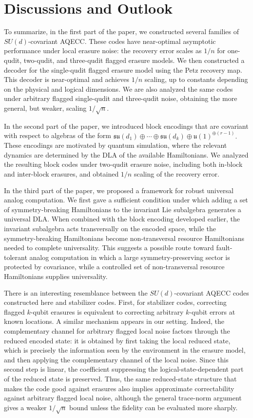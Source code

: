 \documentclass[10pt,twocolumn,superscriptaddress,aps,amsmath,amssymb,citeautoscript,floatfix,prx,longbibliography]{revtex4-2}
\newcounter{alg}
\theoremstyle{plain}
\theoremstyle{plain}
\theoremstyle{plain}
\theoremstyle{plain}
\theoremstyle{plain}
\theoremstyle{plain}
\begin{document}
\section{Discussions and Outlook}\label{sec:main_disc}

To summarize, in the first part of the paper, we constructed several families of \(SU(d)\)-covariant AQECC. These codes have near-optimal asymptotic performance under local erasure noise: the recovery error scales
as \(1/n\) for one-qudit, two-qudit, and three-qudit flagged erasure models. We then constructed a decoder for the single-qudit flagged erasure model using the Petz recovery map. This decoder is near-optimal and achieves \(1/n\) scaling, up to constants depending on the physical and logical dimensions. We are also analyzed the same codes
under arbitrary flagged single-qudit and three-qudit noise, obtaining the more general, but weaker, scaling \(1/\sqrt n\).

In the second part of the paper, we introduced block encodings that are covariant with respect to algebras of the form
$
    \mathfrak{su}(d_1)\oplus\cdots\oplus\mathfrak{su}(d_k)
    \oplus
    \mathfrak{u}(1)^{\oplus(r-1)}.
$
These encodings are motivated by quantum simulation, where the relevant dynamics are determined by the DLA of the available
Hamiltonians. We analyzed the resulting block codes under two-qudit erasure noise, including both in-block and inter-block erasures, and obtained \(1/n\) scaling of the recovery error.

In the third part of the paper, we proposed a framework for robust universal analog computation. We first gave a sufficient condition under which adding a set of symmetry-breaking Hamiltonians to the invariant Lie subalgebra generates a universal DLA. When combined with the block encoding developed
earlier, the invariant subalgebra acts transversally on the encoded space, while the symmetry-breaking Hamiltonians become non-transversal resource Hamiltonians needed to complete universality. This suggests a possible route toward fault-tolerant analog computation in which a large symmetry-preserving sector is protected by covariance, while a controlled
set of non-transversal resource Hamiltonians supplies universality.

There is an interesting resemblance between the \(SU(d)\)-covariant AQECC codes constructed here and stabilizer codes. First, for stabilizer codes, correcting flagged \(k\)-qubit erasures is equivalent to correcting arbitrary \(k\)-qubit errors at known locations. A similar mechanism
appears in our setting. Indeed, the complementary channel for arbitrary flagged local noise factors through the reduced encoded state: it is obtained by first taking the local reduced state, which is precisely the information seen by the environment in the erasure model, and then applying the complementary channel of
the local noise. Since this second step is linear, the coefficient suppressing the logical-state-dependent part of the reduced state is preserved. Thus, the same reduced-state structure that makes the code good against erasures also implies approximate correctability against arbitrary flagged local noise, although the general trace-norm argument gives a weaker \(1/\sqrt n\) bound unless the
fidelity can be evaluated more sharply.
\end{document}
